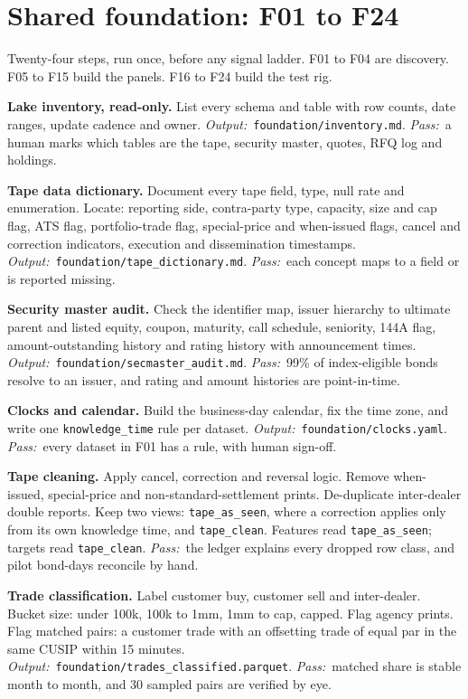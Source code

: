 \documentclass[11pt,letterpaper]{article}
\makeatletter
\newcommand{\code}[1]{\texttt{#1}}
\newcommand*{\twodigit}[1]{\expandafter\@twodigit\csname c@#1\endcsname}
\newcommand*{\@twodigit}[1]{\ifnum#1<10 0\fi\number#1}
\newcommand{\stepname}[1]{\textbf{#1.}}
\newcommand{\Out}{\textit{Output:}~}
\newcommand{\Pass}{\textit{Pass:}~}
\makeatother
\begin{document}
\section{Shared foundation: F01 to F24}
\label{sec:foundation}
Twenty-four steps, run once, before any signal ladder. F01 to F04 are discovery. F05 to F15 build the panels. F16 to F24 build the test rig.

\begin{ladder}[label=\textbf{F\twodigit*}]
\item \stepname{Lake inventory, read-only} List every schema and table with row counts, date ranges, update cadence and owner. \Out \code{foundation/inventory.md}. \Pass a human marks which tables are the tape, security master, quotes, RFQ log and holdings.
\item \stepname{Tape data dictionary} Document every tape field, type, null rate and enumeration. Locate: reporting side, contra-party type, capacity, size and cap flag, ATS flag, portfolio-trade flag, special-price and when-issued flags, cancel and correction indicators, execution and dissemination timestamps. \Out \code{foundation/tape_dictionary.md}. \Pass each concept maps to a field or is reported missing.
\item \stepname{Security master audit} Check the identifier map, issuer hierarchy to ultimate parent and listed equity, coupon, maturity, call schedule, seniority, 144A flag, amount-outstanding history and rating history with announcement times. \Out \code{foundation/secmaster_audit.md}. \Pass 99\% of index-eligible bonds resolve to an issuer, and rating and amount histories are point-in-time.
\item \stepname{Clocks and calendar} Build the business-day calendar, fix the time zone, and write one \code{knowledge_time} rule per dataset. \Out \code{foundation/clocks.yaml}. \Pass every dataset in F01 has a rule, with human sign-off.
\item \stepname{Tape cleaning} Apply cancel, correction and reversal logic. Remove when-issued, special-price and non-standard-settlement prints. De-duplicate inter-dealer double reports. Keep two views: \code{tape_as_seen}, where a correction applies only from its own knowledge time, and \code{tape_clean}. Features read \code{tape_as_seen}; targets read \code{tape_clean}. \Pass the ledger explains every dropped row class, and pilot bond-days reconcile by hand.
\item \stepname{Trade classification} Label customer buy, customer sell and inter-dealer. Bucket size: under 100k, 100k to 1mm, 1mm to cap, capped. Flag agency prints. Flag matched pairs: a customer trade with an offsetting trade of equal par in the same CUSIP within 15 minutes. \Out \code{foundation/trades_classified.parquet}. \Pass matched share is stable month to month, and 30 sampled pairs are verified by eye.

\end{ladder}
\end{document}
